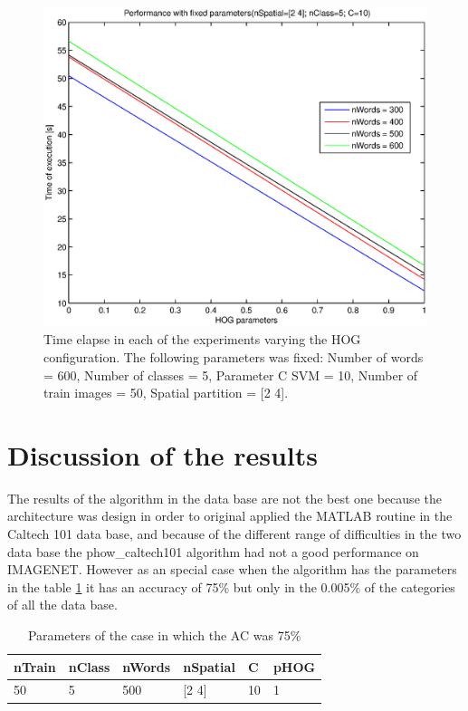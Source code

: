 \documentclass[10pt,twocolumn,letterpaper]{article}
\begin{document}
\begin{figure}[h]
\begin{center}
\includegraphics[width=1\linewidth]{images/pHOG2.eps}
\end{center}
   \caption{
Time elapse in each of the experiments varying the HOG configuration. The following parameters was fixed: Number of words = 600, Number of classes = 5, Parameter C SVM = 10, Number of train images = 50, Spatial partition = [2 4].
   }
\label{pHOG2}
\end{figure}

\section{Discussion of the results}

The results of the algorithm in the data base are not the best one because the architecture was design in order to original applied the MATLAB routine in the Caltech 101 data base, and because of the different range of difficulties in the two data base the phow\_caltech101 algorithm had not a good performance on IMAGENET. However as an special case when the algorithm has the parameters in the table \ref{SpecialCase} it has an accuracy of 75\% but only in the 0.005\% of the categories of all the data base. 

\begin{table}[h]
\centering
\begin{tabular}{|l|l|l|l|l|l|}
\hline
nTrain & nClass & nWords & nSpatial & C & pHOG
\\ \hline
50 & 5 & 500 & [2 4] & 10 & 1 \\ \hline
\end{tabular}
\caption{Parameters of the case in which the AC was 75\%}
\label{SpecialCase}
\end{table}
\end{document}
